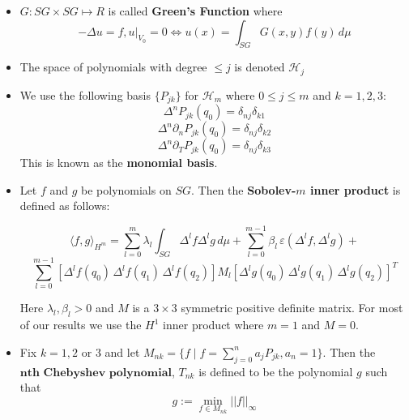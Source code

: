 \documentclass[a0, landscape]{a0poster}
\begin{document}
{\begin{textblock*}{10.75in}
\begin{minipage}{10.75in}
\begin{itemize}
        \item $G: SG \times SG \mapsto R$ is called \textbf{Green's Function} where
        $$ -\Delta u = f, u|_{V_0} = 0 \iff u(x) = \int_{SG}G(x,y)f(y)\,d\mu$$
            \item The space of polynomials with degree $\le j$ is denoted $\mathcal{H}_{j}$
            \item We use the following basis $\{P_{jk}\}$ for $\mathcal{H}_m$ where $0 \leq j \leq m$ and $k=1,2,3$:
            $$\Delta^nP_{jk}(q_0) = \delta_{nj}\delta_{k1}$$
            $$\Delta^n\partial_nP_{jk}(q_0) = \delta_{nj}\delta_{k2}$$
            $$\Delta^n\partial_TP_{jk}(q_0) = \delta_{nj}\delta_{k3}$$
            This is known as the \textbf{monomial basis}.
            \item Let $f$ and $g$ be polynomials on $SG$. Then the \textbf{Sobolev-$m$ inner product} is defined as follows: 
            
            $$\langle f,g\rangle_{H^m}= \sum\limits_{l = 0}^m \lambda_l\int_{SG}\Delta ^lf\Delta ^lg\,d\mu+\sum\limits_{l=0}^{m-1}\beta_l\,\varepsilon(\Delta ^l f,\Delta ^l g)+\nonumber$$
            $$\sum\limits_{l=0}^{m-1}[\Delta  ^lf(q_0)\,\Delta  ^lf(q_1)\,\Delta  ^lf(q_2)] M_l [\Delta  ^lg(q_0)\,\Delta  ^lg(q_1)\,\Delta  ^lg(q_2)]^T$$
            
            Here $\lambda_l, \beta_l >0$ and $M$ is a $3\times3$ symmetric positive definite matrix. For most of our results we use the $H^1$ inner product where $m=1$ and $M = 0$. 
            \item Fix $k=1,2$ or $3$ and let $M_{nk} = \{f \mid f = \sum_{j=0}^{n}a_jP_{jk}, a_n=1\}$. Then the $\textbf{nth Chebyshev polynomial}$, $T_{nk}$ is defined to be the polynomial $g$ such that 
            $$ g := \min_{f \in M_{nk}}||f||_{\infty}$$
        \end{itemize}
  \end{minipage}%
  \end{textblock*}%
}
\end{document}
